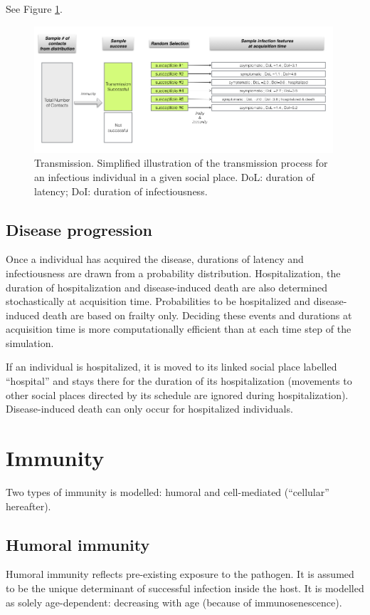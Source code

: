 \documentclass[11pt, onecolumn]{article}
\begin{document}
See Figure \ref{fig:transmission}.


\begin{figure}[!ht]
\centering
    \includegraphics[angle=0,width=0.99\textwidth]{figures/transmission.jpg}
\caption{Transmission. Simplified illustration of the transmission process for an infectious individual in a given social place. DoL: duration of latency; DoI: duration of infectiousness.}
\label{fig:transmission}
\end{figure}


\subsection{Disease progression}

Once a individual has acquired the disease, durations of latency and infectiousness are drawn from a probability distribution. Hospitalization, the duration of hospitalization and disease-induced death are also determined stochastically at acquisition time.
Probabilities to be hospitalized and disease-induced death are based on frailty only.
Deciding these events and durations at acquisition time is more computationally efficient than at each time step of the simulation.

If an individual is hospitalized, it is moved to its linked social place labelled ``hospital'' and stays there for the duration of its hospitalization (movements to other social places directed by its schedule are ignored during hospitalization). Disease-induced death can only occur for hospitalized individuals.


\section{Immunity}

Two types of immunity is modelled: humoral and cell-mediated (``cellular'' hereafter). 

\subsection{Humoral immunity}	
Humoral immunity reflects pre-existing exposure to the pathogen. It is assumed to be the unique determinant of successful infection inside the host. It is modelled as solely age-dependent: decreasing with age (because of immunosenescence).
\end{document}
